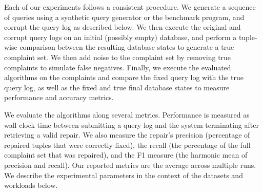 Each of our experiments follows a consistent procedure. 
We generate a sequence of queries using a synthetic query generator or 
the benchmark program, and corrupt the query log as described below. 
We then execute the original and corrupt query logs on an initial (possibly empty) database,
and perform a tuple-wise comparison between the resulting database states 
to generate a true complaint set.  
We then add noise to the complaint set by removing true complaints to simulate false negatives.
Finally, we execute the evaluated algorithms on the complaints and compare the fixed
query log with the true query log, as well as the fixed and true
final database states to measure performance and accuracy metrics.

We evaluate the algorithms along several metrics.  Performance is measured as wall clock
time between submitting a query log and the system terminating after retrieving a valid repair.  
We also measure the repair's precision (percentage of repaired tuples that were correctly fixed), 
the recall (the percentage of the full complaint set that was repaired), 
and the F1 measure (the harmonic mean of precision and recall).
Our reported metrics are the average across multiple runs.
We describe the experimental parameters in the context of the datasets and workloads below.

